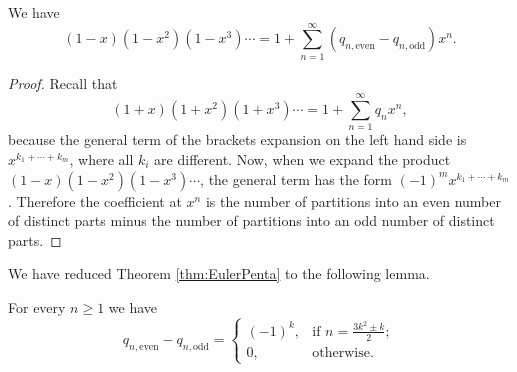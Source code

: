 \begin{page}

\begin{lem}
We have
\[
(1-x)(1-x^2)(1-x^3) \cdots = 1 + \sum_{n=1}^\infty (q_{n,\mathrm{even}} - q_{n,\mathrm{odd}})x^n.
\]
\end{lem}

\end{page}

\begin{page}

\begin{proof}
Recall that
\[
(1+x)(1+x^2)(1+x^3) \cdots = 1 + \sum_{n=1}^\infty q_n x^n,
\]
because the general term of the brackets expansion on the left hand side is $x^{k_1 + \cdots + k_m}$, where all $k_i$ are different.
Now, when we expand the product $(1-x)(1-x^2)(1-x^3)\cdots$, the general term has the form $(-1)^m x^{k_1 + \cdots + k_m}$.
Therefore the coefficient at $x^n$ is the number of partitions into an even number of distinct parts
minus the number of partitions into an odd number of distinct parts.
\end{proof}

We have reduced Theorem \ref{thm:EulerPenta} to the following lemma.

\end{page}

\begin{page}

\begin{lem}
For every $n \ge 1$ we have
\[
q_{n,\mathrm{even}} - q_{n, \mathrm{odd}} =
\begin{cases}
(-1)^k, &\text{if } n = \frac{3k^2 \pm k}2;\\
0, &\text{otherwise.}
\end{cases}
\]
\end{lem}

\end{page}

